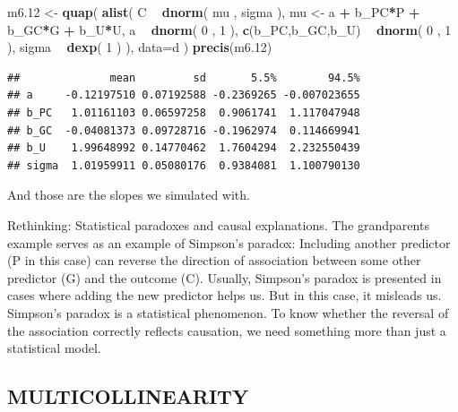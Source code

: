 \documentclass[
]{article}
\newenvironment{Shaded}{\begin{snugshade}}{\end{snugshade}}
\newcommand{\DataTypeTok}[1]{\textcolor[rgb]{0.13,0.29,0.53}{#1}}
\newcommand{\DecValTok}[1]{\textcolor[rgb]{0.00,0.00,0.81}{#1}}
\newcommand{\FloatTok}[1]{\textcolor[rgb]{0.00,0.00,0.81}{#1}}
\newcommand{\KeywordTok}[1]{\textcolor[rgb]{0.13,0.29,0.53}{\textbf{#1}}}
\newcommand{\NormalTok}[1]{#1}
\newcommand{\OperatorTok}[1]{\textcolor[rgb]{0.81,0.36,0.00}{\textbf{#1}}}
\newcommand{\StringTok}[1]{\textcolor[rgb]{0.31,0.60,0.02}{#1}}
\begin{document}
\begin{Shaded}
\begin{Highlighting}[]
\NormalTok{m6}\FloatTok{.12}\NormalTok{ <-}\StringTok{ }\KeywordTok{quap}\NormalTok{( }\KeywordTok{alist}\NormalTok{(}
\NormalTok{C }\OperatorTok{~}\StringTok{ }\KeywordTok{dnorm}\NormalTok{( mu , sigma ),}
\NormalTok{mu <-}\StringTok{ }\NormalTok{a }\OperatorTok{+}\StringTok{ }\NormalTok{b_PC}\OperatorTok{*}\NormalTok{P }\OperatorTok{+}\StringTok{ }\NormalTok{b_GC}\OperatorTok{*}\NormalTok{G }\OperatorTok{+}\StringTok{ }\NormalTok{b_U}\OperatorTok{*}\NormalTok{U,}
\NormalTok{a }\OperatorTok{~}\StringTok{ }\KeywordTok{dnorm}\NormalTok{( }\DecValTok{0}\NormalTok{ , }\DecValTok{1}\NormalTok{ ),}
\KeywordTok{c}\NormalTok{(b_PC,b_GC,b_U) }\OperatorTok{~}\StringTok{ }\KeywordTok{dnorm}\NormalTok{( }\DecValTok{0}\NormalTok{ , }\DecValTok{1}\NormalTok{ ),}
\NormalTok{sigma }\OperatorTok{~}\StringTok{ }\KeywordTok{dexp}\NormalTok{( }\DecValTok{1}\NormalTok{ ) ), }\DataTypeTok{data=}\NormalTok{d )}
\KeywordTok{precis}\NormalTok{(m6}\FloatTok{.12}\NormalTok{)}
\end{Highlighting}
\end{Shaded}

\begin{verbatim}
##              mean         sd       5.5%        94.5%
## a     -0.12197510 0.07192588 -0.2369265 -0.007023655
## b_PC   1.01161103 0.06597258  0.9061741  1.117047948
## b_GC  -0.04081373 0.09728716 -0.1962974  0.114669941
## b_U    1.99648992 0.14770462  1.7604294  2.232550439
## sigma  1.01959911 0.05080176  0.9384081  1.100790130
\end{verbatim}

And those are the slopes we simulated with.

Rethinking: Statistical paradoxes and causal explanations. The
grandparents example serves as an example of Simpson's paradox:
Including another predictor (P in this case) can reverse the direction
of association between some other predictor (G) and the outcome (C).
Usually, Simpson's paradox is presented in cases where adding the new
predictor helps us. But in this case, it misleads us. Simpson's paradox
is a statistical phenomenon. To know whether the reversal of the
association correctly reflects causation, we need something more than
just a statistical model.

\hypertarget{multicollinearity}{%
\subsection{MULTICOLLINEARITY}\label{multicollinearity}}
\end{document}
